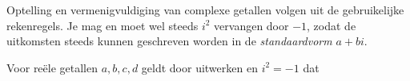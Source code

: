 \documentclass{ximera}
\begin{document}
	\author{Zomercursus KU Leuven}
	\label{xim:cmplx_optellen_en_vermenigvuldigen}



    Optelling en vermenigvuldiging van complexe getallen volgen uit de gebruikelijke rekenregels.
    Je mag en moet wel steeds $i^2$ vervangen door $-1$, zodat de uitkomsten steeds kunnen geschreven worden in de \textit{standaardvorm} $a+bi$. 
    
    \begin{definition} Voor reële getallen $a,b,c,d$ geldt door uitwerken en $i^2=-1$ dat


    
    \end{definition}
\end{document}
